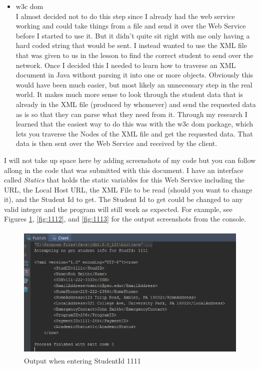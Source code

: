 \documentclass [a4paper,12pt,oneside,final]{book}
\begin{document}
\begin{itemize}
	\item w3c dom \\
	I almost decided not to do this step since I already had the web service working and could take things from a file and send it over the Web Service before I started to use it. But it didn't quite sit right with me only having a hard coded string that would be sent. I instead wanted to use the XML file that was given to us in the lesson to find the correct student to send over the network. Once I decided this I needed to learn how to traverse an XML document in Java without parsing it into one or more objects. Obviously this would have been much easier, but most likely an unnecessary step in the real world. It makes much more sense to look through the student data that is already in the XML file (produced by whomever) and send the requested data as is so that they can parse what they need from it. Through my research I learned that the easiest way to do this was with the w3c dom package, which lets you traverse the Nodes of the XML file and get the requested data. That data is then sent over the Web Service and received by the client.
	\end{itemize}

I will not take up space here by adding screenshots of my code but you can follow allong in the code that was submitted with this document. I have an interface called \emph{Statics} that holds the static variables for this Web Service including the URL, the Local Host URL, the XML File to be read (should you want to change it), and the Student Id to get. The Student Id to get could be changed to any valid integer and the program will still work as expected. For example, see Figures \ref{fig:1111}, \ref{fig:1112}, and \ref{fig:1113} for the output screenshots from the console.

	\begin{figure}[htp]
		\includegraphics[height=65mm]{1111}
		\caption{Output when entering StudentId 1111}
		\label{fig:1111}
	\end{figure}
	
\end{document}
